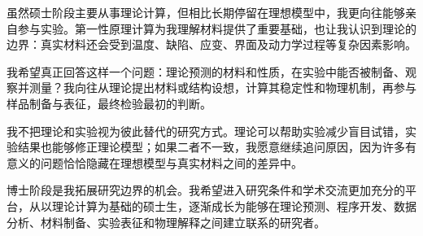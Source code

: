 虽然硕士阶段主要从事理论计算，但相比长期停留在理想模型中，我更向往能够亲自参与实验。第一性原理计算为我理解材料提供了重要基础，也让我认识到理论的边界：真实材料还会受到温度、缺陷、应变、界面及动力学过程等复杂因素影响。

我希望真正回答这样一个问题：理论预测的材料和性质，在实验中能否被制备、观察并测量？我向往从理论提出材料或结构设想，计算其稳定性和物理机制，再参与样品制备与表征，最终检验最初的判断。

我不把理论和实验视为彼此替代的研究方式。理论可以帮助实验减少盲目试错，实验结果也能够修正理论模型；如果二者不一致，我愿意继续追问原因，因为许多有意义的问题恰恰隐藏在理想模型与真实材料之间的差异中。

博士阶段是我拓展研究边界的机会。我希望进入研究条件和学术交流更加充分的平台，从以理论计算为基础的硕士生，逐渐成长为能够在理论预测、程序开发、数据分析、材料制备、实验表征和物理解释之间建立联系的研究者。

